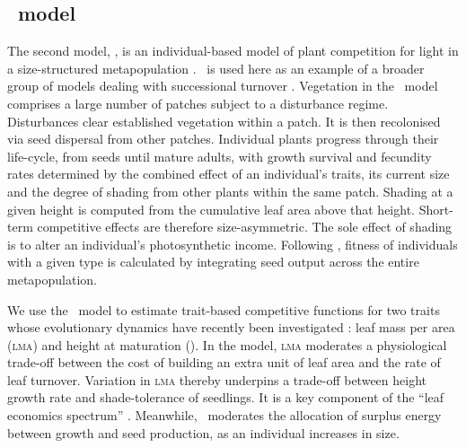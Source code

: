 \documentclass[a4paper,11pt]{article}
\begin{document}
%

\subsection{\plant\ model}

The second model, \plant, is an individual-based model of plant competition for light in a size-structured metapopulation \citep{Falster-2016,Falster-2015}. \plant\ is used here as an example of a broader group of models dealing with successional turnover
\citep{Huston-1987,Kohyama-1993,Moorcroft-2001,Falster-2011}.
%
Vegetation in the \plant\ model comprises a large number of patches subject to a disturbance regime.
Disturbances clear established vegetation within a patch. It is then recolonised via seed dispersal from other patches.
Individual plants progress through their life-cycle, from seeds until mature adults, with growth survival and fecundity rates determined by the combined effect of an individual's traits, its current size and the degree of shading from other plants within the same patch. Shading at a given height is computed from the cumulative leaf area above that height.
Short-term competitive effects are therefore size-asymmetric. The sole effect of shading is to alter an individual's photosynthetic income. Following \citep{Falster-2015}, fitness of individuals with a given type is calculated by integrating seed output across the entire metapopulation.

We use the \plant\ model to estimate trait-based competitive functions for two traits whose evolutionary dynamics have recently been investigated \citep{Falster-2015}: leaf mass per area (\textsc{lma})
and height at maturation (\hmat). In the model, \textsc{lma} moderates a physiological trade-off between the cost of building an extra unit of leaf area and the rate of leaf turnover.
Variation in \textsc{lma}
thereby underpins a trade-off between height growth rate and shade-tolerance of seedlings. It is a key component of the
``leaf economics spectrum'' \citep{Wright-2004}. Meanwhile, \hmat\
moderates the allocation of surplus energy between growth and seed production, as an individual increases in size.
\end{document}
